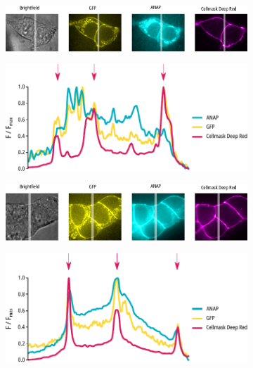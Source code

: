 \begin{figure}[h]
	\centering
	\begin{subfigure}[t]{0.55\textwidth}
		\caption{}\label{ch3fig:wt_confocal}
		\centering
		\includegraphics[width=\textwidth]{wt_confocal.pdf}
	\end{subfigure}
	\hfill
	\begin{subfigure}[t]{0.35\textwidth}
		\caption{}\label{ch3fig:wt_confocal_profiles}
		\centering
		\includegraphics[width=\textwidth]{wt_confocal_profiles.pdf}
	\end{subfigure}
	\vfill
	\begin{subfigure}[t]{0.55\textwidth}
		\caption{}\label{ch3fig:w311_confocal}
		\centering
		\includegraphics[width=\textwidth]{w311_confocal.pdf}
	\end{subfigure}
	\hfill
	\begin{subfigure}[t]{0.35\textwidth}
		\caption{}\label{ch3fig:w311_confocal_profiles}
		\centering
		\includegraphics[width=\textwidth]{w311_confocal_profiles.pdf}

\end{subfigure}
\end{figure}
